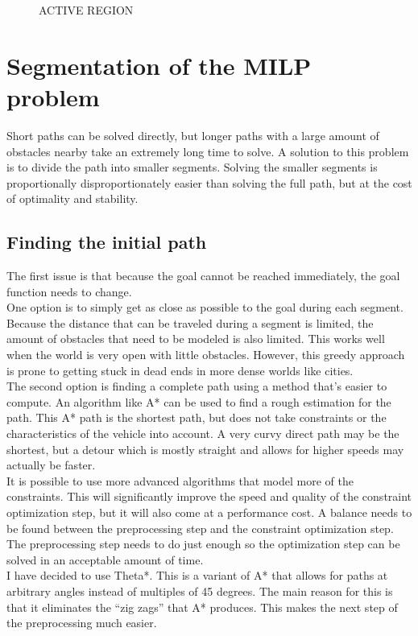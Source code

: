 \documentclass[12pt]{article}
\begin{document}
\begin{figure}[h]
ACTIVE REGION\\
\end{figure}

\section{Segmentation of the MILP problem}
\label{section:segment}

Short paths can be solved directly, but longer paths with a large amount of obstacles nearby take an extremely long time to solve. A solution to this problem is to divide the path into smaller segments. Solving the smaller segments is proportionally disproportionately easier than solving the full path, but at the cost of optimality and stability.
\\
\subsection{Finding the initial path}
The first issue is that because the goal cannot be reached immediately, the goal function needs to change.  \\
One option is to simply get as close as possible to the goal during each segment. Because the distance that can be traveled during a segment is limited, the amount of obstacles that need to be modeled is also limited. This works well when the world is very open with little obstacles. However, this greedy approach is prone to getting stuck in dead ends in more dense worlds like cities.
\\
The second option is finding a complete path using a method that's easier to compute. An algorithm like A* can be used to find a rough estimation for the path. This A* path is the shortest path, but does not take constraints or the characteristics of the vehicle into account. A very curvy direct path may be the shortest, but a detour which is mostly straight and allows for higher speeds may actually be faster. 
\\
It is possible to use more advanced algorithms that model more of the constraints. This will significantly improve the speed and quality of the constraint optimization step, but it will also come at a performance cost. A balance needs to be found between the preprocessing step and the constraint optimization step. The preprocessing step needs to do just enough so the optimization step can be solved in an acceptable amount of time. 
\\
I have decided to use Theta*. This is a variant  of A* that allows for paths at arbitrary angles instead of multiples of 45 degrees. The main reason for this is that it eliminates the ``zig zags'' that A* produces. This makes the next step of the preprocessing much easier.\\
\end{document}
